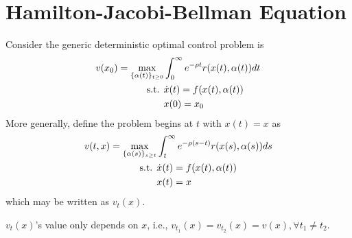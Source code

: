 \documentclass[11pt]{elegantbook}
\begin{document}
\section{Hamilton-Jacobi-Bellman Equation}
Consider the generic deterministic optimal control problem is
\begin{equation}
    \begin{aligned}
        v(x_0)=\max_{\{\alpha(t)\}_{t\geq 0}}&\int_0^\infty e^{-\rho t}r(x(t),\alpha(t))dt\\
        \textnormal{s.t. }&\dot{x}(t)=f(x(t),\alpha(t))\\
        &x(0)=x_0
    \end{aligned}
    \nonumber
\end{equation}
More generally, define the problem begins at $t$ with $x(t)=x$ as
\begin{equation}
    \begin{aligned}
        v(t,x)=\max_{\{\alpha(s)\}_{s\geq t}}&\int_t^\infty e^{-\rho(s-t)}r(x(s),\alpha(s))ds\\
        \textnormal{s.t. }&\dot{x}(t)=f(x(t),\alpha(t))\\
        &x(t)=x
    \end{aligned}
    \nonumber
\end{equation}
which may be written as $v_t(x)$.
\begin{note}
    $v_t(x)$'s value only depends on $x$, i.e., $v_{t_1}(x)=v_{t_2}(x)=v(x),\forall t_1\neq t_2$.
\end{note}
\end{document}
